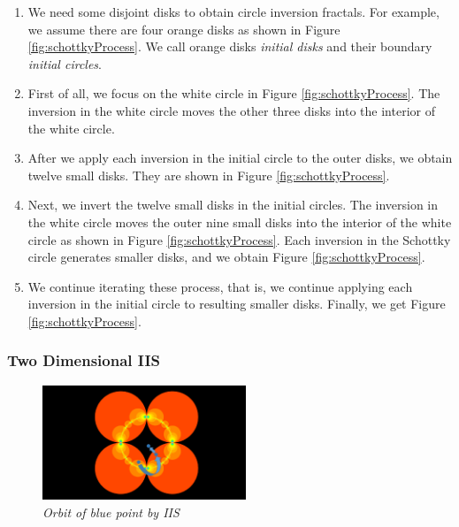 \begin{enumerate}
 \item We need some disjoint disks to obtain circle inversion fractals.
       For example, we assume there are four orange disks as shown in
       Figure \ref{fig:schottkyProcess}. We call orange disks \textit{initial
       disks} and their boundary \textit{initial circles}.
 \item First of all, we focus on the white circle in Figure
       \ref{fig:schottkyProcess}. The inversion in the white circle moves the
       other three disks into the interior of the white circle.
 \item After we apply each inversion in the initial circle to the outer disks,
       we obtain twelve small disks. They are shown in Figure \ref{fig:schottkyProcess}.
 \item Next, we invert the twelve small disks in the initial circles.
       The inversion in the white circle moves the outer nine small disks
       into the interior of the white circle as shown in Figure \ref{fig:schottkyProcess}.
       Each inversion in the Schottky circle generates smaller disks, and we
       obtain Figure \ref{fig:schottkyProcess}.
 \item We continue iterating these process, that is, we continue
       applying each inversion in the initial circle to resulting
       smaller disks.
       Finally, we get Figure \ref{fig:schottkyProcess}.
\end{enumerate}

\subsubsection{Two Dimensional IIS}

\begin{figure}[htbp]
  \center
  \includegraphics[height=1.35in, keepaspectratio]{img/preparation/orbIIS.png}
  \caption{\textit{Orbit of blue point by IIS}}
  \label{fig:iisOrbit}
 \hspace*{\fill}
\end{figure}

